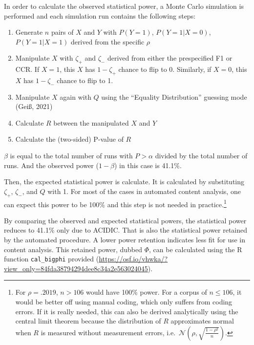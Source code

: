 \documentclass[english,man,floatsintext]{apa6}
\providecommand{\tightlist}{%
  \setlength{\itemsep}{0pt}\setlength{\parskip}{0pt}}
\begin{document}
In order to calculate the observed statistical power, a Monte Carlo simulation is performed and each simulation run contains the following steps:

\begin{enumerate}
\def\labelenumi{\arabic{enumi}.}
\tightlist
\item
  Generate \(n\) pairs of \(X\) and \(Y\) with \(P(Y=1)\), \(P(Y=1|X=0)\), \(P(Y=1|X=1)\) derived from the specific \(\rho\)
\item
  Manipulate \(X\) with \(\zeta_{+}\) and \(\zeta_{-}\) derived from either the prespecified F1 or CCR. If \(X = 1\), this \(X\) has \(1 - \zeta_{+}\) chance to flip to 0. Similarly, if \(X = 0\), this \(X\) has \(1 - \zeta_{-}\) chance to flip to 1.
\item
  Manipulate \(X\) again with \(Q\) using the \enquote{Equality Distribution} guessing mode (Geiß, 2021)
\item
  Calculate \(R\) between the manipulated \(X\) and \(Y\)
\item
  Calculate the (two-sided) P-value of \(R\)
\end{enumerate}

\(\beta\) is equal to the total number of runs with \(P > \alpha\) divided by the total number of runs. And the observed power (\(1 - \beta\)) in this case is 41.1\%.

Then, the expected statistical power is calculate. It is calculated by substituting \(\zeta_{+}\), \(\zeta_{-}\), and \(Q\) with 1. For most of the cases in automated content analysis, one can expect this power to be 100\% and this step is not needed in practice.\footnote{For \(\rho = .2019\), \(n > 106\) would have 100\% power. For a corpus of \(n \le 106\), it would be better off using manual coding, which only suffers from coding errors. If it is really needed, this can also be derived analytically using the central limit theorem because the distribution of \(R\) approximates normal when \(R\) is measured without measurement errors, i.e.~\(\mathcal{N}(\rho, \sqrt{\frac{1 - \rho^{2}}{n}})\).}

By comparing the observed and expected statistical powers, the statistical power reduces to 41.1\% only due to ACIDIC. That is also the statistical power retained by the automated procedure. A lower power retention indicates less fit for use in content analysis. This retained power, dubbed \(\Phi\), can be calculated using the R function \texttt{cal\_bigphi} provided (\url{https://osf.io/vhwka/?view_only=84fda38794294dee8c34a2e563024045}).
\end{document}
